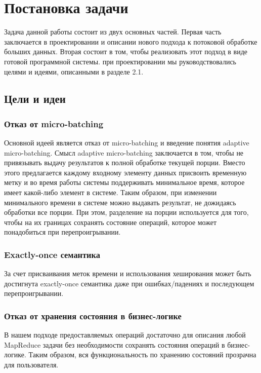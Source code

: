 \documentclass[14pt]{matmex-diploma-custom}
\begin{document}
\section{Постановка задачи}

Задача данной работы состоит из двух основных частей. Первая часть заключается в проектировании и описании нового подхода к потоковой обработке больших данных. Вторая состоит в том, чтобы реализовать этот подход в виде готовой программной системы. при проектировании мы руководствовались целями и идеями, описанными в разделе 2.1.

\subsection{Цели и идеи}

\subsubsection{Отказ от micro-batching}

Основной идеей является отказ от micro-batching и введение понятия adaptive micro-batching. Смысл adaptive micro-batching заключается в том, чтобы не привязывать выдачу результатов к полной обработке текущей порции. Вместо этого предлагается каждому входному элементу данных присвоить временную метку и во время работы системы поддерживать минимальное время, которое имеет какой-либо элемент в системе. Таким образом, при изменении минимального времени в системе можно выдавать результат, не дожидаясь обработки все порции. При этом, разделение на порции используется для того, чтобы на их границах сохранять состояние операций, которое может понадобиться при перепроигрывании.

\subsubsection{Exactly-once семантика}

За счет присваивания меток времени и использования хеширования может быть достигнута exactly-once семантика даже при ошибках/падениях и последующем перепроигрывании.

\subsubsection{Отказ от хранения состояния в бизнес-логике}

В нашем подходе предоставляемых операций достаточно для описания любой MapReduce задачи без необходимости сохранять состояния операций в бизнес-логике. Таким образом, вся функциональность по хранению состояний прозрачна для пользователя.
\end{document}
